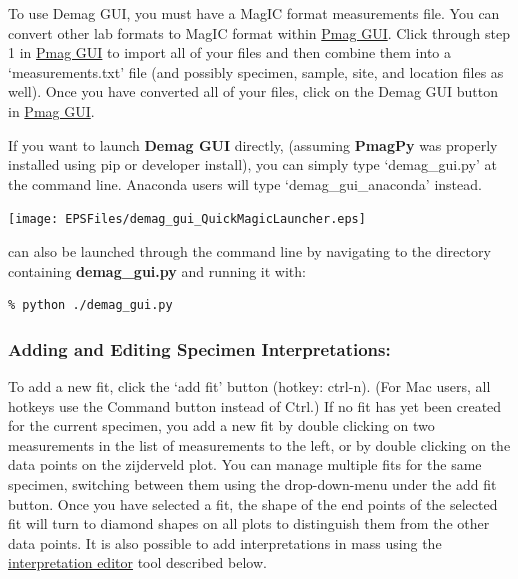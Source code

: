 \documentclass[11pt]{book}
\begin{document}
{{\noindent To use Demag GUI, you must have a MagIC format measurements file.  You can convert other lab formats to MagIC format within \href{#pmag_gui.py}{Pmag GUI}.  Click through step 1 in \href{#pmag_gui.py}{Pmag GUI} to import all of your files and then combine them into a `measurements.txt' file (and possibly specimen, sample, site, and location files as well).  Once you have converted all of your files, click on the Demag GUI button in \href{#pmag_gui.py}{Pmag GUI}.


\noindent If you want to launch {\bf Demag GUI} directly, (assuming {\bf PmagPy} was properly installed using pip or developer install), you can simply type `demag\_gui.py' at the command line. Anaconda users will type `demag\_gui\_anaconda' instead.


\texttt{[image: EPSFiles/demag\_gui\_QuickMagicLauncher.eps]}

 can also be launched through the command line by navigating to the directory containing {\bf demag\_gui.py}  and running it with:\\

\begin{verbatim}
% python ./demag_gui.py
\end{verbatim}



\subsubsection{Adding and Editing Specimen Interpretations:}\label{adding-interpretations}

To add a new fit, click the `add fit' button (hotkey: ctrl-n).  (For Mac users, all hotkeys use the Command button instead of Ctrl.)  If no fit has yet been created for the current specimen, you add a new fit by double clicking on two measurements in the list of measurements to the left, or by double clicking on the data points on the zijderveld plot.  You can manage multiple fits for the same specimen, switching between them using the drop-down-menu under the add fit button.  Once you have selected a fit, the shape of the end points of the selected fit will turn to diamond shapes on all plots to distinguish them from the other data points.  It is also possible to add interpretations in mass using the \hyperref[interpretation-editor]{interpretation editor} tool described below.

}}
\end{document}
